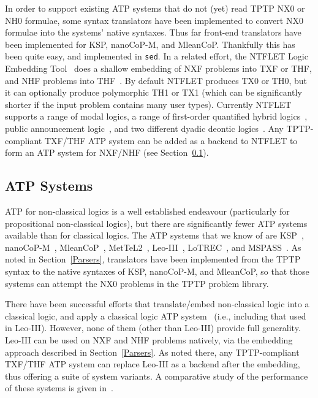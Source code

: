 \documentclass{ceurart}
\begin{document}
In order to support existing ATP systems that do not (yet) read TPTP NX0 or NH0 formulae,
some syntax translators have been implemented to convert NX0 formulae into the systems'
native syntaxes.
Thus far front-end translators have been implemented for KSP, nanoCoP-M, and MleanCoP.
Thankfully this has been quite easy, and implemented in {\tt sed}.
In a related effort, the NTFLET Logic Embedding Tool~\cite{Ste22} does a shallow embedding of 
NXF problems into TXF or THF, and NHF problems into THF~\cite{BP13,BR13,GSB17,GS18}.
By default NTFLET produces TX0 or TH0, but it can optionally produce polymorphic TH1 or TX1
(which can be significantly shorter if the input problem contains many user types).
Currently NTFLET supports a range of modal logics, a range of first-order quantified hybrid 
logics~\cite{AtC07}, public announcement logic~\cite{vvK07,Pac13}, and two different dyadic 
deontic logics~\cite{CJ13,Aqv02}.
Any TPTP-compliant TXF/THF ATP system can be added as a backend to NTFLET to form an 
ATP system for NXF/NHF (see Section~\ref{ATPSystems}).

\subsection{ATP Systems}
\label{ATPSystems}

ATP for non-classical logics is a well established endeavour (particularly for propositional
non-classical logics), but there are significantly fewer ATP systems available than for classical 
logics.
The ATP systems that we know of are KSP~\cite{NHD20,PN+21}, nanoCoP-M~\cite{Ott21}, 
MleanCoP~\cite{Ott14}, MetTeL2~\cite{TSK12}, Leo-III~\cite{SB21}, LoTREC~\cite{FF+01}, and 
MSPASS~\cite{HS00-TABLEAUX}.
As noted in Section~\ref{Parsers}, translators have been implemented from the TPTP syntax to the 
native syntaxes of KSP, nanoCoP-M, and MleanCoP, so that those systems can attempt the NX0 
problems in the TPTP problem library.

There have been successful efforts that translate/embed non-classical logic into a classical
logic, and apply a classical logic ATP system~\cite{HV06,SH07,SS11,GSB17,EA+23} (i.e., including 
that used in Leo-III).
However, none of them (other than Leo-III) provide full generality.
Leo-III can be used on NXF and NHF problems natively, via the embedding approach described 
in Section~\ref{Parsers}.
As noted there, any TPTP-compliant TXF/THF ATP system can replace Leo-III as a backend after
the embedding, thus offering a suite of system variants.
A comparative study of the performance of these systems is given in~\cite{SS+23}.
\end{document}
